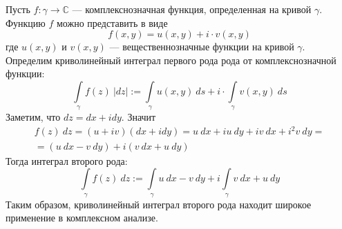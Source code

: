 \begin{comm}
    Пусть $f:\gamma\to \mathbb{C}$ --- комплекснозначная функция, определенная на кривой $\gamma$. Функцию $f$ можно представить в виде
    \[f(x,y)=u(x,y)+i\cdot v(x,y)\]
    где $u(x,y)$ и $v(x,y)$ --- вещественнозначные функции на кривой $\gamma$. Определим криволинейный интеграл первого рода рода от комплекснозначной функции: 
    \[\int\limits_{\gamma}f(z)\ |dz|:=\int\limits_{\gamma}u(x,y)\ ds+i\cdot \int\limits_{\gamma} v(x,y)\ ds\]
    Заметим, что $dz=dx+i dy$. Значит
    \begin{multline*}
        f(z)\ dz=(u+iv)(dx+idy)=u\ dx+iu\ dy+iv\ dx+i^2v\ dy=\\
        =(u\ dx-v\ dy)+i(v\ dx+u\ dy)
    \end{multline*}
    Тогда интеграл второго рода:
    \[\int\limits_{\gamma}f(z)\ dz:=\int\limits_{\gamma}u\ dx-v\ dy+ i \int\limits_{\gamma}v\ dx+u\ dy\]
    Таким образом, криволинейный интеграл второго рода находит широкое применение в комплексном анализе.
\end{comm}
\newpage